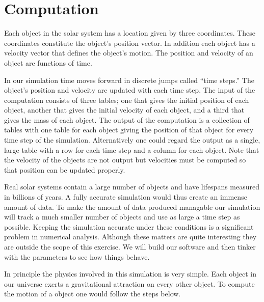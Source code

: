 
\section{Computation}
\label{sec:computation}

Each object in the solar system has a location given by three coordinates. These coordinates
constitute the object's position vector. In addition each object has a velocity vector that
defines the object's motion. The position and velocity of an object are functions of time.

In our simulation time moves forward in discrete jumps called ``time steps.'' The object's
position and velocity are updated with each time step. The input of the computation consists of
three tables; one that gives the initial position of each object, another that gives the initial
velocity of each object, and a third that gives the mass of each object. The output of the
computation is a collection of tables with one table for each object giving the position of that
object for every time step of the simulation. Alternatively one could regard the output as a
single, large table with a row for each time step and a column for each object. Note that the
velocity of the objects are not output but velocities must be computed so that position can be
updated properly.

Real solar systems contain a large number of objects and have lifespans measured in billions of
years. A fully accurate simulation would thus create an immense amount of data. To make the
amount of data produced managable our simulation will track a much smaller number of objects and
use as large a time step as possible. Keeping the simulation accurate under these conditions is
a significant problem in numerical analysis. Although these matters are quite interesting they
are outside the scope of this exercise. We will build our software and then tinker with the
parameters to see how things behave.

In principle the physics involved in this simulation is very simple. Each object in our universe
exerts a gravitational attraction on every other object. To compute the motion of a object one
would follow the steps below.

